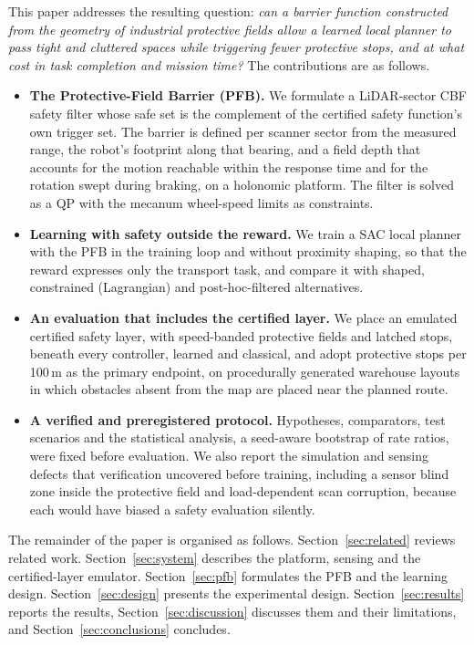 \documentclass[sensors,article,submit,moreauthors]{Definitions/mdpi}
\begin{document}
This paper addresses the resulting question: \emph{can a barrier function constructed from the geometry of industrial protective fields allow a learned local planner to pass tight and cluttered spaces while triggering fewer protective stops, and at what cost in task completion and mission time?} The contributions are as follows.
\begin{itemize}
\item \textbf{The Protective-Field Barrier (PFB).} We formulate a LiDAR-sector CBF safety filter whose safe set is the complement of the certified safety function's own trigger set. The barrier is defined per scanner sector from the measured range, the robot's footprint along that bearing, and a field depth that accounts for the motion reachable within the response time and for the rotation swept during braking, on a holonomic platform. The filter is solved as a QP with the mecanum wheel-speed limits as constraints.
\item \textbf{Learning with safety outside the reward.} We train a SAC local planner with the PFB in the training loop and without proximity shaping, so that the reward expresses only the transport task, and compare it with shaped, constrained (Lagrangian) and post-hoc-filtered alternatives.
\item \textbf{An evaluation that includes the certified layer.} We place an emulated certified safety layer, with speed-banded protective fields and latched stops, beneath every controller, learned and classical, and adopt protective stops per 100\,m as the primary endpoint, on procedurally generated warehouse layouts in which obstacles absent from the map are placed near the planned route.
\item \textbf{A verified and preregistered protocol.} Hypotheses, comparators, test scenarios and the statistical analysis, a seed-aware bootstrap of rate ratios, were fixed before evaluation. We also report the simulation and sensing defects that verification uncovered before training, including a sensor blind zone inside the protective field and load-dependent scan corruption, because each would have biased a safety evaluation silently.
\end{itemize}

The remainder of the paper is organised as follows. Section~\ref{sec:related} reviews related work. Section~\ref{sec:system} describes the platform, sensing and the certified-layer emulator. Section~\ref{sec:pfb} formulates the PFB and the learning design. Section~\ref{sec:design} presents the experimental design. Section~\ref{sec:results} reports the results, Section~\ref{sec:discussion} discusses them and their limitations, and Section~\ref{sec:conclusions} concludes.
\end{document}
